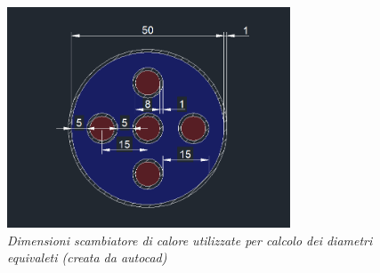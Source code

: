 \documentclass[a4paper,10pt]{article}                                                                                       %
\begin{document}
\begin{figure}[ht!]                                                                                                         %
  \centering                                                                                                                %
  \includegraphics[width=0.75\textwidth]{../final_doc/code_exports/imgs/heat_exchanger.png}                                 %
  \caption{\textit{Dimensioni scambiatore di calore utilizzate per calcolo dei diametri equivaleti (creata da autocad)}}    %
  \label{fig:he}                                                                                                            %
\end{figure}                                                                                                                %

\end{document}
